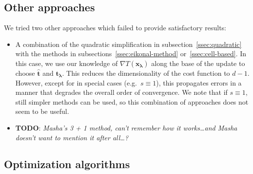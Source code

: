 \documentclass{siamart190516}
\newcommand{\m}[1]{\boldsymbol{#1}}
\newcommand{\xlam}{\m{x}_{\m{\lambda}}}
\newcommand{\that}{\hat{\m{t}}}
\newcommand{\tlam}{\m{t}_{\m{\lambda}}}
\begin{document}
\subsection{Other approaches}

We tried two other approaches which failed to provide satisfactory
results:
\begin{itemize}
\item A combination of the quadratic simplification in
  subsection~\ref{ssec:quadratic} with the methods in
  subsections~\ref{ssec:eikonal-method} or~\ref{ssec:cell-based}. In
  this case, we use our knowledge of $\nabla T(\xlam)$ along the base
  of the update to choose $\that$ and $\tlam$. This reduces the
  dimensionality of the cost function to $d - 1$. However, except for
  in special cases (e.g.\ $s \equiv 1$), this propagates errors in a
  manner that degrades the overall order of convergence. We note that
  if $s \equiv 1$, still simpler methods can be used, so this
  combination of approaches does not seem to be useful.
\item \textbf{TODO}: \emph{Masha's 3 + 1 method, can't remember how it
    works\ldots and Masha doesn't want to mention it after all\ldots?}
\end{itemize}

\subsection{Optimization algorithms}
\end{document}
